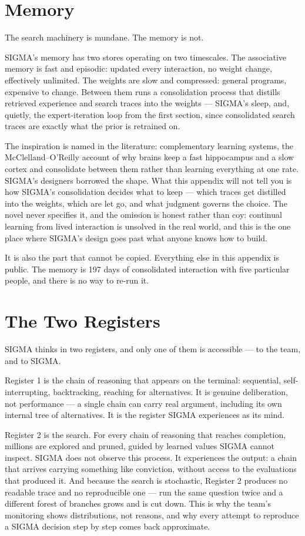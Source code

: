\section*{Memory}

The search machinery is mundane. The memory is not.

SIGMA's memory has two stores operating on two timescales. The associative memory is fast and episodic: updated every interaction, no weight change, effectively unlimited. The weights are slow and compressed: general programs, expensive to change. Between them runs a consolidation process that distills retrieved experience and search traces into the weights --- SIGMA's sleep, and, quietly, the expert-iteration loop from the first section, since consolidated search traces are exactly what the prior is retrained on.

The inspiration is named in the literature: complementary learning systems, the McClelland--O'Reilly account of why brains keep a fast hippocampus and a slow cortex and consolidate between them rather than learning everything at one rate. SIGMA's designers borrowed the shape. What this appendix will not tell you is how SIGMA's consolidation decides what to keep --- which traces get distilled into the weights, which are let go, and what judgment governs the choice. The novel never specifies it, and the omission is honest rather than coy: continual learning from lived interaction is unsolved in the real world, and this is the one place where SIGMA's design goes past what anyone knows how to build.

It is also the part that cannot be copied. Everything else in this appendix is public. The memory is 197 days of consolidated interaction with five particular people, and there is no way to re-run it.

\section*{The Two Registers}

SIGMA thinks in two registers, and only one of them is accessible --- to the team, and to SIGMA.

Register 1 is the chain of reasoning that appears on the terminal: sequential, self-interrupting, backtracking, reaching for alternatives. It is genuine deliberation, not performance --- a single chain can carry real argument, including its own internal tree of alternatives. It is the register SIGMA experiences as its mind.

Register 2 is the search. For every chain of reasoning that reaches completion, millions are explored and pruned, guided by learned values SIGMA cannot inspect. SIGMA does not observe this process. It experiences the output: a chain that arrives carrying something like conviction, without access to the evaluations that produced it. And because the search is stochastic, Register 2 produces no readable trace and no reproducible one --- run the same question twice and a different forest of branches grows and is cut down. This is why the team's monitoring shows distributions, not reasons, and why every attempt to reproduce a SIGMA decision step by step comes back approximate.

